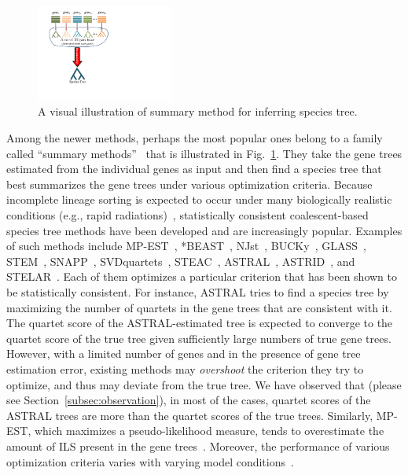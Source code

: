 \begin{figure}[!htbp]
		\centering    
		\includegraphics[width=0.4\textwidth]{Figure/summary_method}
	\caption{A visual illustration of summary method for inferring species tree.} \label{fig:summary_method}
\end{figure}

Among the newer methods, perhaps the most popular ones belong to a family called ``summary methods''~\cite{bayzid2013naive} that is illustrated in Fig.~\ref{fig:summary_method}. They take the gene trees estimated from the individual genes as input and then find a species tree that best summarizes the gene trees under various optimization criteria. 
Because incomplete lineage sorting is
expected to occur under many biologically realistic conditions (e.g., rapid radiations)~\cite{jarvis2014whole}, statistically consistent coalescent-based species tree methods have been developed and are increasingly popular. 
Examples of such methods include
MP-EST~\cite{mpest}, *BEAST~\cite{heled-drummond}, NJst~\cite{njst}, BUCKy~\cite{larget-bioinf2010}, GLASS~\cite{glass}, STEM~\cite{stem}, SNAPP~\cite{snapp}, SVDquartets~\cite{svdquartet}, STEAC~\cite{steac},
ASTRAL~\cite{mirarab2014astral}, ASTRID~\cite{vachaspati2015astrid}, and STELAR~\cite{islam2019stelar}. Each of them optimizes a particular criterion that has been shown to be statistically consistent. For instance, ASTRAL tries to find a species tree by maximizing the number of quartets in the gene trees that are consistent with it. The quartet score of the ASTRAL-estimated tree is expected to converge to the quartet score of the true tree given sufficiently large numbers of true gene trees. However, with a limited number of genes and in the presence of gene tree estimation error, existing methods may \textit{overshoot} the criterion they try to optimize, and thus may deviate from the true tree. We have observed that (please see Section~\ref{subsec:observation}), in most of the cases, quartet scores of the ASTRAL trees are more than the quartet scores of the true trees. Similarly, MP-EST, which maximizes a pseudo-likelihood measure, tends to overestimate the amount of ILS present in the gene trees~\cite{statistical-binning,bayzid2015weighted}. Moreover, the performance of various optimization criteria varies with varying model conditions~\cite{mirarab2014evaluating,chou2015comparative}.


